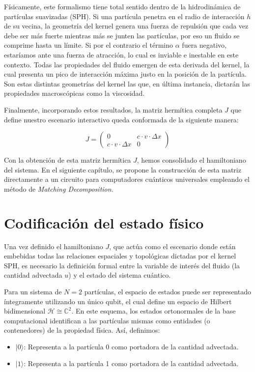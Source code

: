 Físicamente, este formalismo tiene total sentido dentro de la hidrodinámica de partículas suavizadas (SPH). Si una partícula penetra en el radio de interacción $h$ de su vecina, la geometría del kernel genera una fuerza de repulsión que cada vez debe ser más fuerte mientras más se junten las partículas, por eso un fluido se comprime hasta un límite. Si por el contrario el término $\alpha$ fuera negativo, estaríamos ante una fuerza de atracción, lo cual es inviable e inestable en este contexto. Todas las propiedades del fluido emergen de esta derivada del kernel, la cual presenta un pico de interacción máxima justo en la posición de la partícula. Son estas distintas geometrías del kernel las que, en última instancia, dictarán las propiedades macroscópicas como la viscosidad.

Finalmente, incorporando estos resultados, la matriz hermítica completa $J$ que define nuestro escenario interactivo queda conformada de la siguiente manera: 

\begin{equation}
J = 
\begin{pmatrix}
0 & c \cdot v \cdot \Delta x \\
c \cdot v \cdot \Delta x & 0
\end{pmatrix}
\label{mat: J}
\end{equation}

Con la obtención de esta matriz hermítica $J$, hemos consolidado el hamiltoniano del sistema. En el siguiente capítulo, se propone la construcción de esta matriz directamente a un circuito para computadores cuánticos universales empleando el método de \textit{Matching Decomposition}.

\section{Codificación del estado físico}
\label{sec:codificacion_estado}

Una vez definido el hamiltoniano $J$, que actúa como el escenario donde están embebidas todas las relaciones espaciales y topológicas dictadas por el kernel SPH, es necesario la definición formal entre la variable de interés del fluido (la cantidad advectada $u$) y el estado del sistema cuántico. 

Para un sistema de $N=2$ partículas, el espacio de estados puede ser representado íntegramente utilizando un único qubit, el cual define un espacio de Hilbert bidimensional $\mathcal{H} \cong \mathbb{C}^2$. En este esquema, los estados ortonormales de la base computacional identifican a las partículas mismas como entidades (o contenedores) de la propiedad física. Así, definimos:
\begin{itemize}
    \item $|0\rangle$: Representa a la partícula 0 como portadora de la cantidad advectada.
    \item $|1\rangle$: Representa a la partícula 1 como portadora de la cantidad advectada.
\end{itemize}

